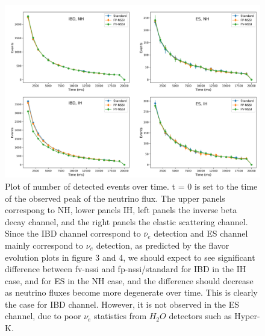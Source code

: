\documentclass[11pt, oneside]{article}   	%
\begin{document}
\begin{figure}[t]
\begin{center}
\includegraphics[width=\linewidth]{detector_data.png}
\caption{Plot of number of detected events over time. t = 0 is set to the time of the observed peak of the neutrino flux. The upper panels correspong to NH, lower panels IH, left panels the inverse beta decay channel, and the right panels the elastic scattering channel. Since the IBD channel correspond to $\bar \nu_e$ detection and ES channel mainly correspond to $\nu_e$ detection, as predicted by the flavor evolution plots in figure 3 and 4, we should expect to see significant difference between fv-nssi and fp-nssi/standard for IBD in the IH case, and for ES in the NH case, and the difference should decrease as neutrino fluxes become more degenerate over time. This is clearly the case for IBD channel. However, it is not observed in the ES channel, due to poor $\nu_e$ statistics from $H_2O$ detectors such as Hyper-K.}
\label{fig:detector_data}
\end{center}
\end{figure}
\end{document}
